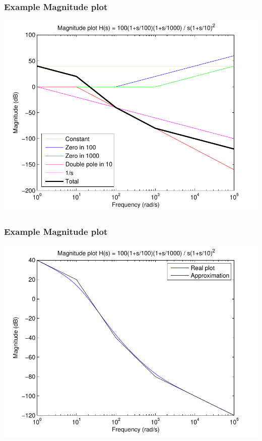 \begin{frame}
\frametitle{Example Magnitude plot}

\begin{center}
\includegraphics[scale=0.5]{MagnitudeParts}
\end{center}


\end{frame}

\begin{frame}
\frametitle{Example Magnitude plot}

\begin{center}
\includegraphics[scale=0.5]{MagnitudeApprox}
\end{center}


\end{frame}

